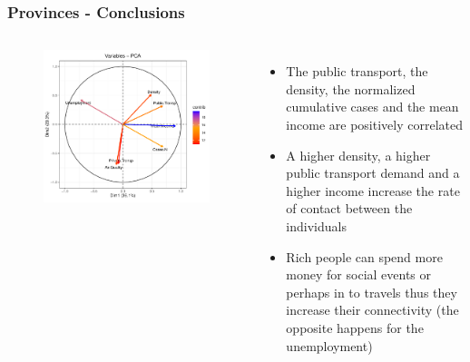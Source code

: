 \documentclass[compress]{beamer}
\begin{document}
\begin{frame}


\frametitle{Provinces - Conclusions}

\begin{columns}
\begin{figure}[H]
\centering
\begin{minipage}{\textwidth}
  \centering
  \includegraphics[width=\linewidth, ]{Pic/Province_FULL_Variables-PCA.pdf}
\end{minipage}%
\end{figure}
\begin{itemize}
\item The public transport, the density, the normalized cumulative cases and the mean income are positively correlated
\item A higher density, a higher public transport demand and a higher income increase the rate of contact between the individuals \cite{neiderud2015urbanization,world2010hidden}
\item Rich people can spend more money for social events or perhaps in to travels thus they increase their connectivity (the opposite happens for the unemployment)\cite{weyers2008low}
\end{itemize}
\end{columns}
\end{frame}
\end{document}

